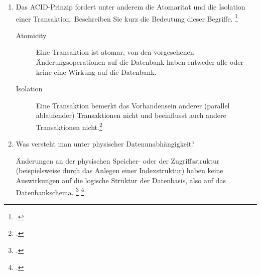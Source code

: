 \documentclass{bschlangaul-aufgabe}
\begin{document}

\let\m=\bAttributMenge
\let\fa=\bFunktionaleAbhaengigkeit

\begin{enumerate}


\item Das ACID-Prinzip fordert unter anderem die Atomaritat und die
Isolation einer Transaktion. Beschreiben Sie kurz die Bedeutung dieser
Begriffe.
\footcite{examen:66116:2019:03}

\begin{bAntwort}
\begin{description}
\item[Atomicity]

Eine Transaktion ist atomar, \dh von den vorgesehenen
Änderungsoperationen auf die Datenbank haben entweder alle oder keine
eine Wirkung auf die Datenbank.

\item[Isolation]

Eine Transaktion bemerkt das Vorhandensein anderer (parallel
ablaufender) Transaktionen nicht und beeinflusst auch andere
Transaktionen nicht.\footcite[Kapitel 9.5 „Eigenschaften von Transaktionen“, Seite 305]{kemper}
\end{description}
\end{bAntwort}


\item Was versteht man unter physischer Datenunabhängigkeit?

\begin{bAntwort}
Änderungen an der physischen Speicher- oder der Zugriffsstruktur
(beispielsweise durch das Anlegen einer Indexstruktur) haben keine
Auswirkungen auf die logische Struktur der Datenbasis, also auf das
Datenbankschema.
\footcite[Seite 20]{db:fs:3}
\footcite[Kapitel 1.3 Datenunabhängigkeit Seite 24]{kemper}
\end{bAntwort}



\end{enumerate}
\end{document}
